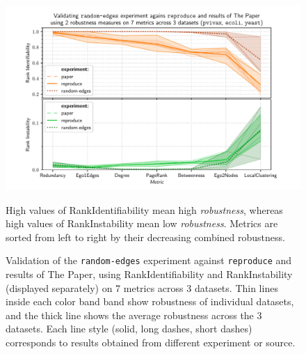 \begin{figure}
    \includegraphics[width=\linewidth]{plot_random_edges.pdf}
    \vspace*{-0.6cm}
    \caption{Validation of the \texttt{random-edges} experiment against \texttt{reproduce} and results of The Paper, using RankIdentifiability and RankInstability (displayed separately) on 7 metrics across 3 datasets.
    Thin lines inside each color band band show robustness of individual datasets, and the thick line shows the average robustness across the 3 datasets.
    Each line style (solid, long dashes, short dashes) corresponds to results obtained from different experiment or source.}
    \label{fig:plot_random_edges}
    \footnotesize
    \begin{flushleft}
        High values of RankIdentifiability mean high \textsl{robustness}, whereas high values of RankInstability mean low \textsl{robustness}.
        Metrics are sorted from left to right by their decreasing combined robustness.
    \end{flushleft}
\end{figure}
